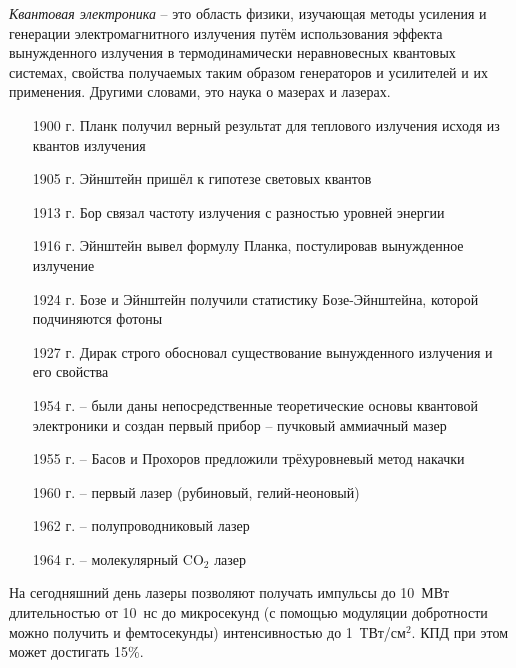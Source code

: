 

\emph{Квантовая электроника} -- это область физики, изучающая методы усиления
и генерации электромагнитного излучения путём использования эффекта
вынужденного излучения в термодинамически неравновесных квантовых системах,
свойства получаемых таким образом генераторов и усилителей и их применения.
Другими словами, это наука о мазерах и лазерах.

\begin{enumerate}
    \item[1900 г.] Планк получил верный результат для теплового излучения исходя
        из квантов излучения
    \item[1905 г.] Эйнштейн пришёл к гипотезе световых квантов
    \item[1913 г.] Бор связал частоту излучения с разностью уровней энергии
    \item[1916 г.] Эйнштейн вывел формулу Планка, постулировав вынужденное
        излучение
    \item[1924 г.] Бозе и Эйнштейн получили статистику Бозе-Эйнштейна, которой
        подчиняются фотоны
    \item[1927 г.] Дирак строго обосновал существование вынужденного излучения
        и его свойства
\end{enumerate}

\begin{enumerate}
    \item[1954 г.] -- были даны непосредственные теоретические основы
        квантовой электроники и создан первый прибор -- пучковый аммиачный
        мазер
    \item[1955 г.] -- Басов и Прохоров предложили трёхуровневый метод накачки
    \item[1960 г.] -- первый лазер (рубиновый, гелий-неоновый)
    \item[1962 г.] -- полупроводниковый лазер
    \item[1964 г.] -- молекулярный \( \mathrm{CO_2} \) лазер
\end{enumerate}

На сегодняшний день лазеры позволяют получать импульсы до 10~МВт длительностью
от 10~нс до микросекунд (с помощью модуляции добротности можно получить и
фемтосекунды) интенсивностью до 1~ТВт/\(\text{см}^2\). КПД при этом может
достигать 15\%.

